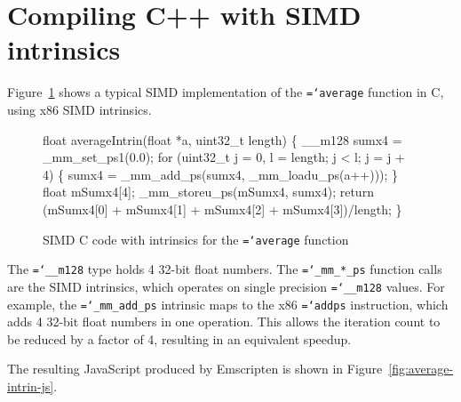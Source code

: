\documentclass[preprint]{sigplanconf}
\newcommand{\ttt}[1]{{\texttt{\hyphenchar\font=`\-\relax #1}}}%
\begin{document}
\section{Compiling C++ with SIMD intrinsics}

Figure~\ref{fig:average-intrin} shows a typical SIMD implementation of the
\ttt{average} function in C, using x86 SIMD intrinsics.

\begin{figure}
\begin{small}
\begin{program}[style=tt, number=true]
fl\tab{}oat averageIntrin(float *a, uint32\_t length) \{
  \_\_m128 sumx4 = \_mm\_set\_ps1(0.0);
  fo\tab{}r (uint32\_t j = 0, l = length; j < l; j = j + 4) \{
    sumx4 = \_mm\_add\_ps(sumx4, \_mm\_loadu\_ps(a++)));\untab{}
  \}
  float mSumx4[4];
  \_mm\_storeu\_ps(mSumx4, sumx4);
  return (\tab{}mSumx4[0] + mSumx4[1] +
          mSumx4[2] + mSumx4[3])/length;\untab{}\untab{}
\}
\end{program}
\end{small}
\caption{SIMD C code with intrinsics for the \ttt{average} function}
\label{fig:average-intrin}
\end{figure}

The \ttt{\_\_m128} type holds 4 32-bit float numbers.  The \ttt{\_mm\_*\_ps}
function calls are the SIMD intrinsics, which operates on single precision 
\ttt{\_\_m128} values.  For example, the \ttt{\_mm\_add\_ps} intrinsic maps 
to the x86 \ttt{addps} instruction, which adds 4 32-bit float numbers in one 
operation.  This allows the iteration count to be reduced by a factor of 4,
resulting in an equivalent speedup.

The resulting JavaScript produced by Emscripten is shown in
Figure~\ref{fig:average-intrin-js}.
\end{document}
